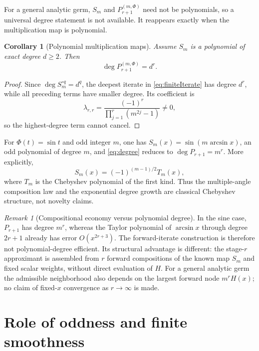 \documentclass[11pt]{article}
\newtheorem{corollary}[theorem]{Corollary}
\theoremstyle{remark}
\newtheorem{remark}[theorem]{Remark}
\begin{document}
For a general analytic germ, \(S_m\) and
\(P_{r+1}^{(m,\Phi)}\) need not be polynomials, so a universal degree
statement is not available.  It reappears exactly when the multiplication
map is polynomial.

\begin{corollary}[Polynomial multiplication maps]
\label{cor:degree}
Assume \(S_m\) is a polynomial of exact degree \(d\ge2\).  Then
\begin{equation}
\boxed{
\deg P_{r+1}^{(m,\Phi)}=d^r.
}
\label{eq:degree}
\end{equation}
\end{corollary}

\begin{proof}
Since \(\deg S_m^{\circ q}=d^q\), the deepest iterate in
\eqref{eq:finiteIterate} has degree \(d^r\), while all preceding terms
have smaller degree.  Its coefficient is
\[
\lambda_{r,r}
=
\frac{(-1)^r}{\prod_{j=1}^r(m^{2j}-1)}
\neq0,
\]
so the highest-degree term cannot cancel.
\end{proof}

For \(\Phi(t)=\sin t\) and odd integer \(m\), one has
\(S_m(x)=\sin(m\arcsin x)\), an odd polynomial of degree \(m\), and
\eqref{eq:degree} reduces to \(\deg P_{r+1}=m^r\).  More explicitly,
\[
S_m(x)=(-1)^{(m-1)/2}T_m(x),
\]
where \(T_m\) is the Chebyshev polynomial of the first kind.  Thus the
multiple-angle composition law and the exponential degree growth are
classical Chebyshev structure, not novelty claims.

\begin{remark}[Compositional economy versus polynomial degree]
In the sine case, \(P_{r+1}\) has degree \(m^r\), whereas the Taylor
polynomial of \(\arcsin x\) through degree \(2r+1\) already has error
\(O(x^{2r+3})\).  The forward-iterate construction is therefore not
polynomial-degree efficient.  Its structural advantage is different: the
stage-\(r\) approximant is assembled from \(r\) forward compositions of
the known map \(S_m\) and fixed scalar weights, without direct evaluation
of \(H\).  For a general analytic germ the admissible neighborhood also
depends on the largest forward node \(m^rH(x)\); no claim of fixed-\(x\)
convergence as \(r\to\infty\) is made.
\end{remark}

\section{Role of oddness and finite smoothness}
\end{document}
